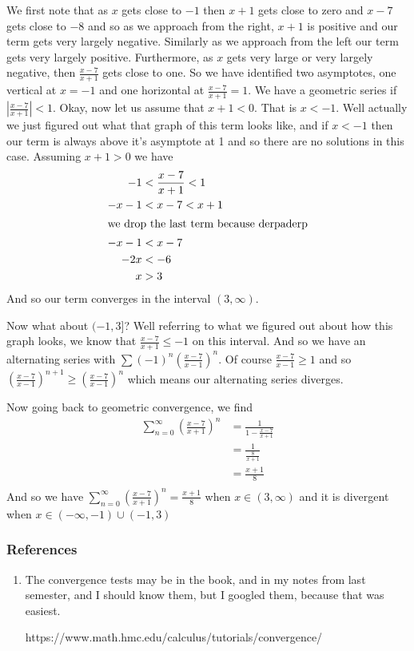 \documentclass[letterpaper]{article}
\begin{document}
\begin{enumerate}
  We first note that as $x$ gets close to $-1$ then $x+1$ gets close to zero and $x-7$ gets close to $-8$ and so as we approach from the right, $x+1$ is positive and our term gets very largely negative. Similarly as we approach from the left our term gets very largely positive. Furthermore, as $x$ gets very large or very largely negative, then $\frac{x-7}{x+1}$ gets close to one. So we have identified two asymptotes, one vertical at $x=-1$ and one horizontal at $\frac{x-7}{x+1}=1$. We have a geometric series if $\left\lvert\frac{x-7}{x+1}\right\rvert<1$. Okay, now let us assume that $x+1<0$. That is $x<-1$. Well actually we just figured out what that graph of this term looks like, and if $x<-1$ then our term is always above it's asymptote at 1 and so there are no solutions in this case. Assuming $x+1>0$ we have
  \begin{align*}
    -1&<\frac{x-7}{x+1}<1\\
    -x-1&<x-7<x+1\\
    \intertext{we drop the last term because derpaderp}
    -x-1&<x-7\\
    -2x&<-6\\
    x&>3
  \end{align*}
  And so our term converges in the interval $(3,\infty)$.

  Now what about $(-1,3]$? Well referring to what we figured out about how this graph looks, we know that $\frac{x-7}{x+1}\le -1$ on this interval. And so we have an alternating series with $\sum{(-1)^n\left(\frac{x-7}{x-1}\right)^n}$. Of course $\frac{x-7}{x-1}\ge1$ and so $\left(\frac{x-7}{x-1}\right)^{n+1}\ge \left(\frac{x-7}{x-1}\right)^n$ which means our alternating series diverges.

  Now going back to geometric convergence, we find
  \begin{align*}
    \sum\limits_{n=0}^\infty{\left(\frac{x-7}{x+1}\right)^n}
    &=\frac{1}{1-\frac{x-7}{x+1}}\\
    &=\frac{1}{\frac{8}{x+1}}\\
    &=\frac{x+1}{8}\\
  \end{align*}
  And so we have $\sum\limits_{n=0}^\infty{\left(\frac{x-7}{x+1}\right)^n}=\frac{x+1}{8}$ when $x\in (3,\infty)$ and it is divergent when $x\in (-\infty,-1)\cup(-1,3)$
\end{enumerate}
\subsubsection*{References}
\begin{enumerate}
\item
The convergence tests may be in the book, and in my notes from last semester, and I should know them, but I googled them, because that was easiest.

https://www.math.hmc.edu/calculus/tutorials/convergence/
\end{enumerate}
\end{document}

